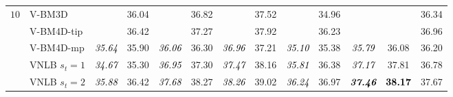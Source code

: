 \documentclass[10pt, a4paper]{article}
\newcommand{\best}[1]{#1}
\newcommand{\bsic}[1]{\textcolor{black}{\textit{#1}}}
\newcommand{\Bsic}[1]{\textcolor{black}{\textbf{\textit{#1}}}}
\newcommand{\Best}[1]{\textbf{\textcolor{black}{#1}}}
\begin{document}
\begin{table}[htp!]
\begin{center}
{\begin{tabular}{ c | l |c c | c c | c c | c c | c c | c}
%
			\multirow{1}{*}{$10$}
			                      & V-BM3D               & \bsic{     } &       36.04  & \bsic{     } &       36.82  & \bsic{     } &       37.52  & \bsic{     } &       34.96  & \bsic{     } &              &       36.34  \\
			                      & V-BM4D-tip           & \bsic{     } & \best{36.42} & \bsic{     } & \best{37.27} & \bsic{     } &       37.92  & \bsic{     } &       36.23  & \bsic{     } &              &       36.96  \\
			                      & V-BM4D-mp            & \bsic{35.64} &       35.90  & \bsic{36.06} &       36.30  & \bsic{36.96} &       37.21  & \bsic{35.10} &       35.38  & \bsic{35.79} &       36.08  &       36.20  \\
			                      & VNLB   $s_t = 1$     & \bsic{34.67} &       35.30  & \bsic{36.95} &       37.30  & \bsic{37.47} &       38.16  & \bsic{35.81} &       36.38  & \bsic{37.17} &       37.81  &       36.78  \\
			                      & VNLB   $s_t = 2$     & \bsic{35.88} &       36.42  & \bsic{37.68} &       38.27  & \bsic{38.26} &       39.02  & \bsic{36.24} &       36.97  & \Bsic{37.46} & \Best{38.17} &       37.67  \\

\end{tabular}}
\end{center}
\end{table}
\end{document}

